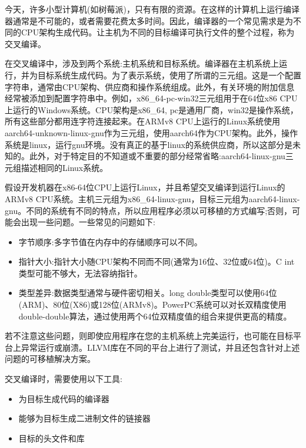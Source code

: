 今天，许多小型计算机(如树莓派)，只有有限的资源。在这样的计算机上运行编译器通常是不可能的，或者需要花费太多时间。因此，编译器的一个常见需求是为不同的CPU架构生成代码。让主机为不同的目标编译可执行文件的整个过程，称为交叉编译。

在交叉编译中，涉及到两个系统:主机系统和目标系统。编译器在主机系统上运行，并为目标系统生成代码。为了表示系统，使用了所谓的三元组。这是一个配置字符串，通常由CPU架构、供应商和操作系统组成。此外，有关环境的附加信息经常被添加到配置字符串中。例如，x86\_64-pc-win32三元组用于在64位x86 CPU上运行的Windows系统。CPU架构是x86\_64, pc是通用厂商，win32是操作系统，所有这些部分都用连字符连接起来。在ARMv8 CPU上运行的Linux系统使用aarch64-unknown-linux-gnu作为三元组，使用aarch64作为CPU架构。此外，操作系统是linux，运行gnu环境。没有真正的基于linux的系统供应商，所以这部分是未知的。此外，对于特定目的不知道或不重要的部分经常省略:aarch64-linux-gnu三元组描述相同的Linux系统。

假设开发机器在x86-64位CPU上运行Linux，并且希望交叉编译到运行Linux的ARMv8 CPU系统。主机三元组为x86\_64-linux-gnu，目标三元组为aarch64-linux-gnu。不同的系统有不同的特点，所以应用程序必须以可移植的方式编写;否则，可能会出现一些问题。一些常见的问题如下:

\begin{itemize}
\item
字节顺序:多字节值在内存中的存储顺序可以不同。

\item
指针大小:指针大小随CPU架构不同而不同(通常为16位、32位或64位)。C int类型可能不够大，无法容纳指针。

\item
类型差异:数据类型通常与硬件密切相关。long double类型可以使用64位(ARM)、80位(X86)或128位(ARMv8)。PowerPC系统可以对长双精度使用double-double算法，通过使用两个64位双精度值的组合来提供更高的精度。
\end{itemize}

若不注意这些问题，则即使应用程序在您的主机系统上完美运行，也可能在目标平台上异常运行或崩溃。LLVM库在不同的平台上进行了测试，并且还包含针对上述问题的可移植解决方案。

交叉编译时，需要使用以下工具:

\begin{itemize}
\item
为目标生成代码的编译器

\item
能够为目标生成二进制文件的链接器

\item
目标的头文件和库
\end{itemize}

